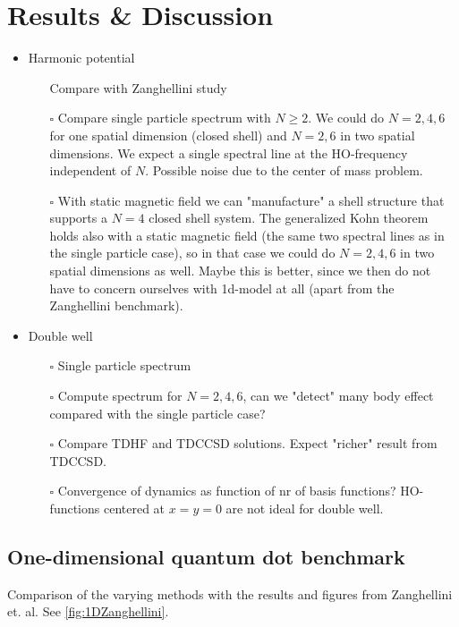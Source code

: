 \documentclass[aip,jcp,reprint,floatfix]{revtex4-1}
\newcommand{\todo}{$\square$}
\begin{document}
\section{Results \& Discussion}
    
    \begin{itemize}
        \item Harmonic potential
        \begin{itemize}
            \item [\checkmark] Compare with Zanghellini study
            \item [\todo] Compare single particle spectrum with $N \geq 2$. We could do $N=2,4,6$ for one spatial dimension (closed shell) and $N=2,6$ in two spatial dimensions. We expect a single spectral line at the HO-frequency independent of $N$. Possible noise due to the center of mass problem.
            \item[\todo] With static magnetic field we can "manufacture" a shell structure that supports a $N=4$ closed shell system. The generalized Kohn theorem holds also with a static magnetic field (the same two spectral lines as in the single particle case), so in that case we could do $N=2,4,6$ in two spatial dimensions as well. Maybe this is better, since we then do not have to concern ourselves with 1d-model at all (apart from the Zanghellini benchmark).
        \end{itemize}
        \item Double well
        \begin{itemize}
            \item [\todo] Single particle spectrum
            \item [\todo] Compute spectrum for $N=2,4,6$, can we "detect" many body effect compared with the single particle case?
            \item[\todo] Compare TDHF and TDCCSD solutions. Expect "richer" result from TDCCSD.
            \item [\todo] Convergence of dynamics as function of nr of basis functions? HO-functions centered at $x=y=0$ are not ideal for double well.
        \end{itemize}
        
    \end{itemize}
    
    \subsection{One-dimensional quantum dot benchmark}
        Comparison of the varying methods with the results and figures from Zanghellini et. al\cite{Zanghellini04}.
        See \autoref{fig:1DZanghellini}.
        
\end{document}
